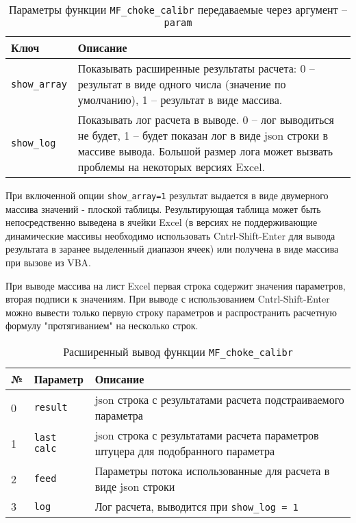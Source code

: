 \begin{table}[H]
	\caption{Параметры функции  \texttt{MF_choke_calibr} передаваемые через аргумент -- \texttt{param}}
	\label{table:param_list}
	\begin{tabular}{p{}p{}}
		\hline
		Ключ & Описание  \\ \hline
		\texttt{show_array} & Показывать расширенные результаты расчета: 0 -- результат в виде одного числа (значение по умолчанию), 1 -- результат в виде массива.    \\ \hline
		
		\texttt{show_log} & Показывать лог расчета в выводе. 0 -- лог выводиться не будет, 1 -- будет показан лог в виде json строки в массиве вывода. Большой размер лога может вызвать проблемы на некоторых версиях Excel.   \\ \hline
		
	\end{tabular}
\end{table}

При включенной опции \texttt{show_array=1} результат выдается в виде двумерного массива значений - плоской таблицы. Результирующая таблица может быть непосредственно выведена в ячейки Excel (в версиях не поддерживающие динамические массивы необходимо использовать Cntrl-Shift-Enter для вывода результата в заранее выделенный диапазон ячеек) или получена в виде массива при вызове из VBA.

При выводе массива на лист Excel первая строка содержит значения параметров, вторая подписи к значениям. При выводе с использованием Cntrl-Shift-Enter можно вывести только первую строку параметров и распространить расчетную формулу "протягиванием" на несколько строк.

\begin{table}[H]
	\caption{Расширенный вывод функции \texttt{MF_choke_calibr} }
	\label{table:param_list_MF_choke_calibr}
	\begin{tabular}{p{}p{}p{}}
		\hline
		№& Параметр & Описание  \\ \hline
		0 & \texttt{result} & json строка с результатами расчета подстраиваемого параметра \\ \hline
		1 & \texttt{last calc} & json строка с результатами расчета параметров штуцера для подобранного параметра \\ \hline
		2 & \texttt{feed} & Параметры потока использованные для расчета в виде json строки\\ \hline
		3 & \texttt{log} & Лог расчета, выводится при \texttt{show_log = 1}  \\ \hline
		
	\end{tabular}
\end{table}

